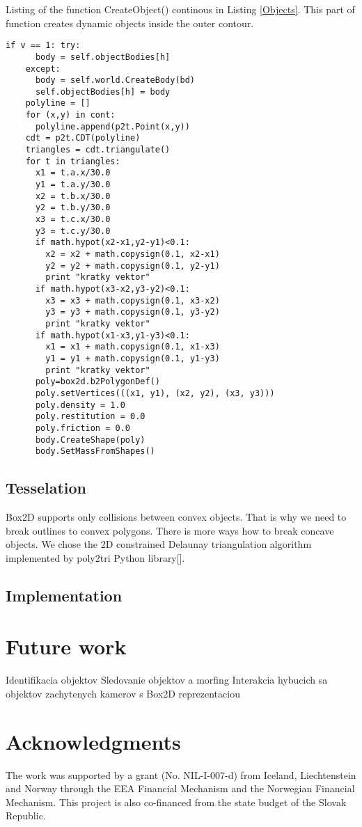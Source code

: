 \documentclass{ifacconf}
\begin{document}
Listing of the function CreateObject() continous in Listing \ref{Objects}. This
part of function creates dynamic objects inside the outer contour.
\begin{lstlisting}[name=Objects,firstnumber=auto,label=Objects,caption=Creation of objecs] if v == 1: try:
      body = self.objectBodies[h]
    except:
      body = self.world.CreateBody(bd)
      self.objectBodies[h] = body
    polyline = []
    for (x,y) in cont:
      polyline.append(p2t.Point(x,y))
    cdt = p2t.CDT(polyline)
    triangles = cdt.triangulate()
    for t in triangles:
      x1 = t.a.x/30.0
      y1 = t.a.y/30.0
      x2 = t.b.x/30.0
      y2 = t.b.y/30.0
      x3 = t.c.x/30.0
      y3 = t.c.y/30.0
      if math.hypot(x2-x1,y2-y1)<0.1:
        x2 = x2 + math.copysign(0.1, x2-x1)
        y2 = y2 + math.copysign(0.1, y2-y1)
        print "kratky vektor"
      if math.hypot(x3-x2,y3-y2)<0.1:
        x3 = x3 + math.copysign(0.1, x3-x2)
        y3 = y3 + math.copysign(0.1, y3-y2)
        print "kratky vektor"
      if math.hypot(x1-x3,y1-y3)<0.1:
        x1 = x1 + math.copysign(0.1, x1-x3)
        y1 = y1 + math.copysign(0.1, y1-y3)
        print "kratky vektor"
      poly=box2d.b2PolygonDef()
      poly.setVertices(((x1, y1), (x2, y2), (x3, y3)))
      poly.density = 1.0
      poly.restitution = 0.0
      poly.friction = 0.0
      body.CreateShape(poly)
      body.SetMassFromShapes()
\end{lstlisting}

\subsection{Tesselation}
Box2D supports only collisions between convex objects. That is why we need to
break outlines to convex polygons. There is more ways how to break concave
objects. We chose the 2D constrained Delaunay triangulation algorithm
implemented by poly2tri Python library[\cite{Delauanay}].

\subsection{Implementation}
\section{Future work}
Identifikacia objektov
Sledovanie objektov a morfing 
Interakcia hybucich sa objektov zachytenych kamerov s Box2D reprezentaciou

\section*{Acknowledgments}
The work was supported by a grant (No. NIL-I-007-d) from Iceland, Liechtenstein 
and Norway through the EEA Financial Mechanism and the Norwegian Financial 
Mechanism. This project is also co-financed from the state budget of the Slovak
Republic.


%
\end{document}
